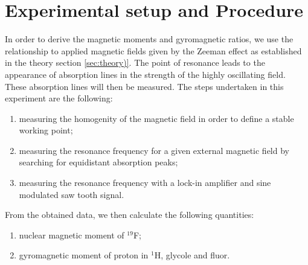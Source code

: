 \section{Experimental setup and Procedure}
\label{sec:procedure}
In order to derive the magnetic moments and gyromagnetic ratios, 
we use the relationship to applied magnetic fields given by the Zeeman effect 
as established in the theory section \ref{sec:theory)}. 
The point of resonance leads to the appearance of absorption lines 
in the strength of the highly oscillating field. These absorption lines 
will then be measured. 
The steps undertaken in this experiment are the following:
\begin{enumerate}
\item
measuring the homogenity of the magnetic field in order to define a stable working point;
\item
measuring the resonance frequency for a given external magnetic field by searching for 
equidistant absorption peaks;
\item
measuring the resonance frequency with a lock-in amplifier and sine modulated saw tooth signal.
\end{enumerate}
From the obtained data, we then calculate the following quantities:
\begin{enumerate}
\item
nuclear magnetic moment of $^19$F;
\item
gyromagnetic moment of proton in $^1$H, glycole and fluor.
\end{enumerate}

